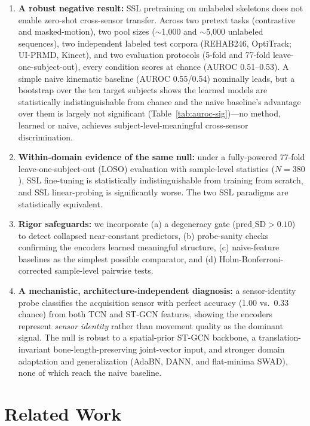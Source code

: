 \documentclass[10pt,journal]{IEEEtran}
\begin{document}
\begin{enumerate}
    \item \textbf{A robust negative result:} SSL pretraining on unlabeled skeletons does not enable zero-shot cross-sensor transfer. Across two pretext tasks (contrastive and masked-motion), two pool sizes ($\sim$1,000 and $\sim$5,000 unlabeled sequences), two independent labeled test corpora (REHAB246, OptiTrack; UI-PRMD, Kinect), and two evaluation protocols (5-fold and 77-fold leave-one-subject-out), every condition scores at chance (AUROC 0.51--0.53). A simple naive kinematic baseline (AUROC 0.55/0.54) nominally leads, but a bootstrap over the ten target subjects shows the learned models are statistically indistinguishable from chance and the naive baseline's advantage over them is largely not significant (Table~\ref{tab:auroc-sig})---no method, learned or naive, achieves subject-level-meaningful cross-sensor discrimination.
    \item \textbf{Within-domain evidence of the same null:} under a fully-powered 77-fold leave-one-subject-out (LOSO) evaluation with sample-level statistics ($N=380$), SSL fine-tuning is statistically indistinguishable from training from scratch, and SSL linear-probing is significantly worse. The two SSL paradigms are statistically equivalent.
    \item \textbf{Rigor safeguards:} we incorporate (a) a degeneracy gate ($\text{pred\_SD} > 0.10$) to detect collapsed near-constant predictors, (b) probe-sanity checks confirming the encoders learned meaningful structure, (c) naive-feature baselines as the simplest possible comparator, and (d) Holm-Bonferroni-corrected sample-level pairwise tests.
    \item \textbf{A mechanistic, architecture-independent diagnosis:} a sensor-identity probe classifies the acquisition sensor with perfect accuracy (1.00 vs.\ 0.33 chance) from both TCN and ST-GCN features, showing the encoders represent \emph{sensor identity} rather than movement quality as the dominant signal. The null is robust to a spatial-prior ST-GCN backbone, a translation-invariant bone-length-preserving joint-vector input, and stronger domain adaptation and generalization (AdaBN, DANN, and flat-minima SWAD), none of which reach the naive baseline.
\end{enumerate}

\section{Related Work}
\label{sec:related}
\end{document}
